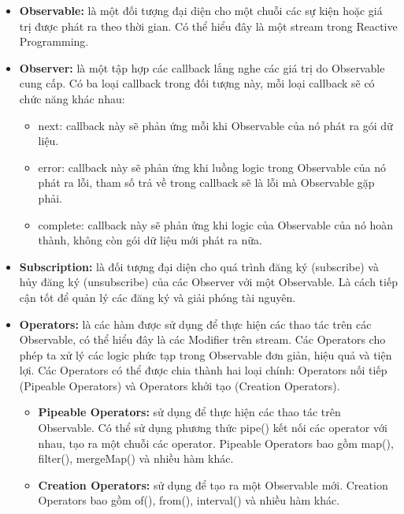 \begin{itemize}
      \item \textbf{Observable:} là một đối tượng đại diện cho một chuỗi các sự kiện hoặc giá trị được phát ra theo thời gian.  Có thể hiểu đây là một stream trong Reactive Programming.
      \item \textbf{Observer:} là một tập hợp các callback lắng nghe các giá trị do Observable cung cấp.
            Có ba loại callback trong đối tượng này, mỗi loại callback sẽ có chức năng khác nhau:
            \begin{itemize}
                  \item next: callback này sẽ phản ứng mỗi khi Observable của nó phát ra gói dữ liệu.
                  \item error: callback này sẽ phản ứng khi luồng logic trong Observable của nó phát ra lỗi, tham số trả về trong callback sẽ là lỗi mà Observable gặp phải.
                  \item complete: callback này sẽ phản ứng khi logic của Observable của nó hoàn thành, không còn gói dữ liệu mới phát ra nữa.
            \end{itemize}
      \item \textbf{Subscription:} là đối tượng đại diện cho quá trình đăng ký (subscribe) và hủy đăng ký (unsubscribe) của các Observer với một Observable.
            Là cách tiếp cận tốt để quản lý các đăng ký và giải phóng tài nguyên.
      \item \textbf{Operators:} là các hàm được sử dụng để thực hiện các thao tác trên các Observable, có thể hiểu đây là các Modifier trên stream.
            Các Operators cho phép ta xử lý các logic phức tạp trong Observable đơn giản, hiệu quả và tiện lợi.
            Các Operators có thể được chia thành hai loại chính: Operators nối tiếp (Pipeable Operators) và Operators khởi tạo (Creation Operators).
            \begin{itemize}
                  \item \textbf{Pipeable Operators:} sử dụng để thực hiện các thao tác trên Observable.
                        Có thể sử dụng phương thức pipe() kết nối các operator với nhau, tạo ra một chuỗi các operator.
                        Pipeable Operators bao gồm map(), filter(), mergeMap() và nhiều hàm khác.
                  \item \textbf{Creation Operators:} sử dụng để tạo ra một Observable mới.
                        Creation Operators bao gồm of(), from(), interval() và nhiều hàm khác.
            \end{itemize}

\end{itemize}

